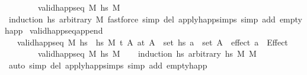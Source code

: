 \begin{isabellebody}
\ \ \ \ \ \ \ \ valid{\isacharunderscore}{\kern0pt}happ{\isacharunderscore}{\kern0pt}seq\ M\ hs{}\ M{\isacharprime}{\kern0pt}{\isachardoublequoteclose}\isanewline
%
\isadelimproof
\ \ %
\endisadelimproof
%
\isatagproof
{}\isamarkupfalse%
\ {\isacharparenleft}{\kern0pt}induction\ hs{}\ arbitrary{\isacharcolon}{\kern0pt}\ M{\isacharparenright}{\kern0pt}\ {\isacharparenleft}{\kern0pt}fastforce\ simp\ del{\isacharcolon}{\kern0pt}\ apply{\isacharunderscore}{\kern0pt}happ{\isachardot}{\kern0pt}simps\ simp\ add{\isacharcolon}{\kern0pt}\ empty{\isacharunderscore}{\kern0pt}happ{\isacharparenright}{\kern0pt}{\isacharplus}{\kern0pt}%
\endisatagproof
{\isafoldproof}%
%
\isadelimproof
\isanewline
%
\endisadelimproof
\isanewline
{}\isamarkupfalse%
\ valid{\isacharunderscore}{\kern0pt}happ{\isacharunderscore}{\kern0pt}seq{\isacharunderscore}{\kern0pt}append{\isacharunderscore}{\kern0pt}{}{\isacharprime}{\kern0pt}{\isacharcolon}{\kern0pt}\isanewline
\ \ {\isachardoublequoteopen}{\isasymlbrakk}\ valid{\isacharunderscore}{\kern0pt}happ{\isacharunderscore}{\kern0pt}seq\ M\ {\isacharparenleft}{\kern0pt}hs{}\ {\isacharat}{\kern0pt}\ hs{}{\isacharparenright}{\kern0pt}\ M{\isacharprime}{\kern0pt}{\isacharsemicolon}{\kern0pt}\ {\isasymAnd}t\ A\ a{\isachardot}{\kern0pt}{\isasymlbrakk}{\isacharparenleft}{\kern0pt}t{\isacharcomma}{\kern0pt}\ A{\isacharparenright}{\kern0pt}\ {\isasymin}\ set\ hs{}{\isacharsemicolon}{\kern0pt}\ a\ {\isasymin}\ set\ A{\isasymrbrakk}\ {\isasymLongrightarrow}\ effect\ a\ {\isacharequal}{\kern0pt}\ Effect\ {\isacharbrackleft}{\kern0pt}{\isacharbrackright}{\kern0pt}\ {\isacharbrackleft}{\kern0pt}{\isacharbrackright}{\kern0pt}{\isasymrbrakk}\ {\isasymLongrightarrow}\isanewline
\ \ \ \ \ \ \ \ valid{\isacharunderscore}{\kern0pt}happ{\isacharunderscore}{\kern0pt}seq\ M\ hs{}\ M{\isacharprime}{\kern0pt}{\isachardoublequoteclose}\isanewline
%
\isadelimproof
\ \ %
\endisadelimproof
%
\isatagproof
{}\isamarkupfalse%
\ {\isacharparenleft}{\kern0pt}induction\ hs{}\ arbitrary{\isacharcolon}{\kern0pt}\ hs{}\ M\ M{\isacharprime}{\kern0pt}{\isacharparenright}{\kern0pt}\ \isanewline
\ \ \isamarkupfalse%
\ {\isacharparenleft}{\kern0pt}auto\ simp\ del{\isacharcolon}{\kern0pt}\ apply{\isacharunderscore}{\kern0pt}happ{\isachardot}{\kern0pt}simps\ simp\ add{\isacharcolon}{\kern0pt}\ empty{\isacharunderscore}{\kern0pt}happ{\isacharparenright}{\kern0pt}\isanewline
\ \ \isamarkupfalse%

\end{isabellebody}
